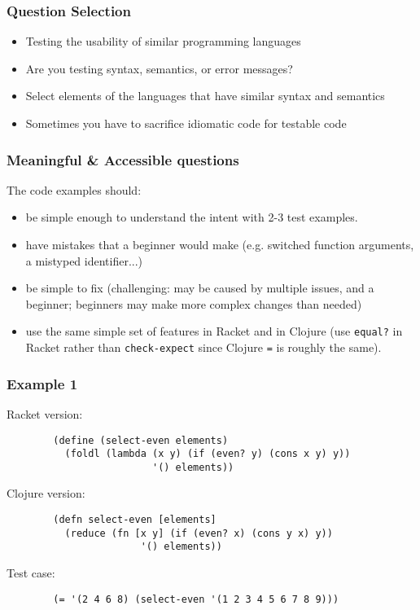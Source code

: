 \documentclass{beamer}
\begin{document}
\begin{frame}
\frametitle{Question Selection}
	\begin{itemize}
		\item Testing the usability of similar programming languages
		\item Are you testing syntax, semantics, or error messages?
		\item Select elements of the languages that have similar syntax and semantics
		\item Sometimes you have to sacrifice idiomatic code for testable code
	\end{itemize}
\end{frame}

\begin{frame}
	\frametitle{Meaningful \& Accessible questions}
The code examples should: 
	\begin{itemize}
		\item be simple enough to understand the intent with 2-3 test examples. 
		\item have mistakes that a beginner would make (e.g. switched function arguments, a mistyped identifier...) 
		\item be simple to fix (challenging: may  be caused by multiple issues, and a beginner; beginners may make more complex changes than needed)
		\item use the same simple set of features in Racket and in Clojure (use \texttt{equal?} in Racket rather than \texttt{check-expect} since Clojure {\tt =} is roughly the same). 
	\end{itemize}
\end{frame}

\begin{frame}[fragile]
\frametitle{Example 1}
Racket version:
\begin{verbatim}
		(define (select-even elements) 
		  (foldl (lambda (x y) (if (even? y) (cons x y) y)) 
                         '() elements))
\end{verbatim}
Clojure version:  
\begin{verbatim}
		(defn select-even [elements] 
		  (reduce (fn [x y] (if (even? x) (cons y x) y))  
                       '() elements))
\end{verbatim}
Test case:
\begin{verbatim}
		(= '(2 4 6 8) (select-even '(1 2 3 4 5 6 7 8 9)))
\end{verbatim}
\end{frame}
\end{document}
